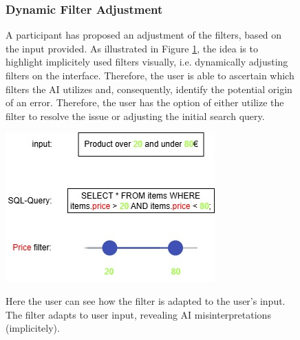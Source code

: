 \documentclass[../../submission.tex]{subfiles}
\begin{document}
 \begin{figure}[h]
     \centering
     \begin{minipage}{0.40\textwidth}
        \subsubsection{Dynamic Filter Adjustment}
        A participant has proposed an adjustment of the filters, based on the input provided. As illustrated in Figure \ref{fig:filter}, 
        the idea is to highlight implicitely used filters visually, i.e. dynamically adjusting filters on the interface. 
        Therefore, the user is able to ascertain 
        which filters the AI utilizes and, consequently, identify the potential origin of an error. Therefore, the user 
        has the option of either utilize the filter to resolve the issue or adjusting the initial search query.       
     \end{minipage}
     \hfill
     \begin{minipage}{0.43\textwidth}
        \includegraphics[width=\textwidth]{images/filter}
        \caption{Here the user can see how the filter is adapted to the user's input. The filter adapts to user input, revealing AI misinterpretations (implicitely).}
        \Description{}
        \label{fig:filter} 
    \end{minipage}
 \end{figure}
\end{document}
